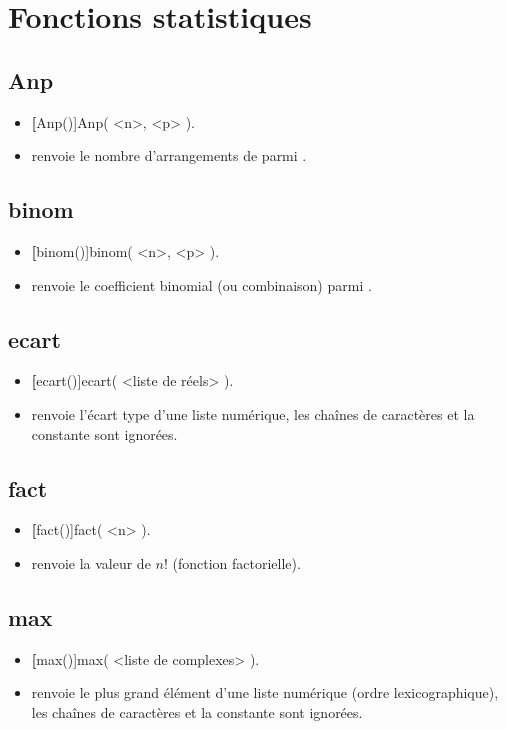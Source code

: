 \section{Fonctions statistiques}

\subsection{Anp}
\begin{itemize}
 \item \util \textbf[Anp()]{Anp( <n>, <p> )}.
 \item \desc renvoie le nombre d'arrangements de  parmi .
\end{itemize}

\subsection{binom}
\begin{itemize}
 \item \util \textbf[binom()]{binom( <n>, <p> )}.
 \item \desc renvoie le coefficient binomial (ou combinaison)  parmi .
\end{itemize}


\subsection{ecart}
\begin{itemize}
 \item \util \textbf[ecart()]{ecart( <liste de réels> )}.
 \item \desc renvoie l'écart type d'une liste numérique, les chaînes de caractères et la constante \jump sont ignorées.
\end{itemize}

\subsection{fact}
\begin{itemize}
 \item \util \textbf[fact()]{fact( <n> )}.
 \item \desc renvoie la valeur de $n!$ (fonction factorielle).
\end{itemize}


\subsection{max}
\begin{itemize}
 \item \util \textbf[max()]{max( <liste de complexes> )}.
 \item \desc renvoie le plus grand élément d'une liste numérique (ordre lexicographique), les chaînes de caractères et la constante \jump sont ignorées.
\end{itemize}

